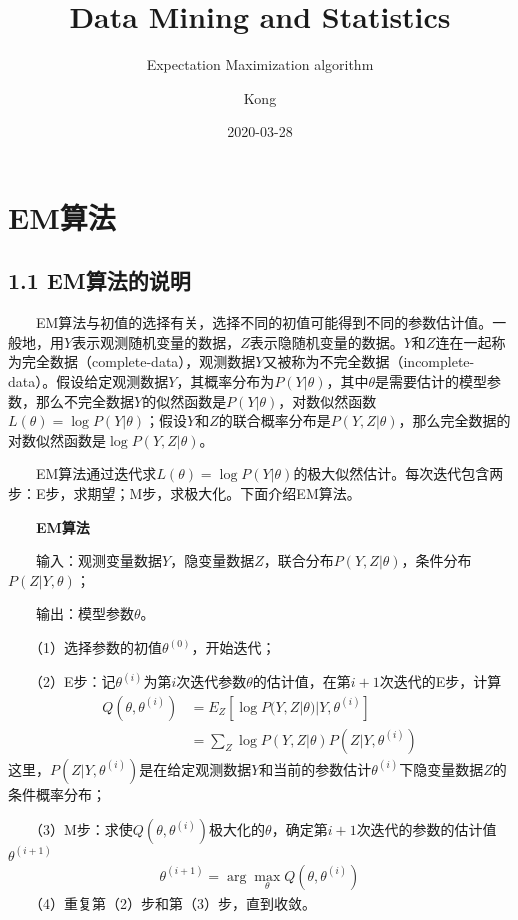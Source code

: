 \documentclass[
  12pt,
]{article}
\title{Data Mining and Statistics}
\subtitle{Expectation Maximization algorithm}
\author{Kong}
\date{2020-03-28}
\begin{document}
\maketitle

{
\setcounter{tocdepth}{3}
\tableofcontents
}
\hypertarget{emux7b97ux6cd5}{%
\section{EM算法}\label{emux7b97ux6cd5}}

\hypertarget{emux7b97ux6cd5ux7684ux8bf4ux660e}{%
\subsection{1.1 EM算法的说明}\label{emux7b97ux6cd5ux7684ux8bf4ux660e}}

　　EM算法与初值的选择有关，选择不同的初值可能得到不同的参数估计值。一般地，用\(Y\)表示观测随机变量的数据，\(Z\)表示隐随机变量的数据。\(Y\)和\(Z\)连在一起称为完全数据（complete-data），观测数据\(Y\)又被称为不完全数据（incomplete-data）。假设给定观测数据\(Y\)，其概率分布为\(P(Y|\theta)\)，其中\(\theta\)是需要估计的模型参数，那么不完全数据\(Y\)的似然函数是\(P(Y|\theta)\)，对数似然函数\(L(\theta)=\log{P(Y|\theta)}\)；假设\(Y\)和\(Z\)的联合概率分布是\(P(Y,Z|\theta)\)，那么完全数据的对数似然函数是\(\log{P(Y,Z|\theta)}\)。

　　EM算法通过迭代求\(L(\theta)=\log{P(Y|\theta)}\)的极大似然估计。每次迭代包含两步：E步，求期望；M步，求极大化。下面介绍EM算法。

　　\textbf{EM算法}

　　输入：观测变量数据\(Y\)，隐变量数据\(Z\)，联合分布\(P(Y,Z|\theta)\)，条件分布\(P(Z|Y,\theta)\)；

　　输出：模型参数\(\theta\)。

　　（1）选择参数的初值\(\theta^{(0)}\)，开始迭代；

　　（2）E步：记\(\theta^{(i)}\)为第\(i\)次迭代参数\(\theta\)的估计值，在第\(i+1\)次迭代的E步，计算
\[
\begin{split}
Q(\theta,\theta^{(i)})&=
E_Z[\log{P(Y,Z|\theta)|Y,\theta^{(i)}}]\\&=
\sum_{Z}\log{P(Y,Z|\theta)}P(Z|Y,\theta^{(i)})
\end{split}
\tag{1.1}
\]
这里，\(P(Z|Y,\theta^{(i)})\)是在给定观测数据\(Y\)和当前的参数估计\(\theta^{(i)}\)下隐变量数据\(Z\)的条件概率分布；

　　（3）M步：求使\(Q(\theta,\theta^{(i)})\)极大化的\(\theta\)，确定第\(i+1\)次迭代的参数的估计值\(\theta^{(i+1)}\)
\[
\begin{split}
\theta^{(i+1)}=\arg{\max_{\theta}Q(\theta,\theta^{(i)})}
\end{split}
\tag{1.2}
\] 　　（4）重复第（2）步和第（3）步，直到收敛。
\end{document}
